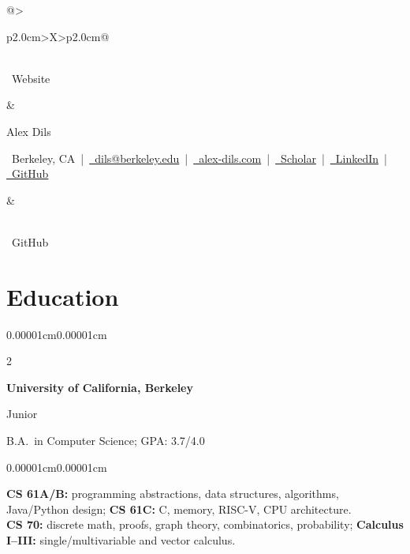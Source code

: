 \documentclass[10pt, letterpaper]{article}
\newenvironment{onecolentry}{
  \begin{adjustwidth}{0.00001cm}{0.00001cm}
}{
  \end{adjustwidth}
}
\newenvironment{twocolentry}[2][]{
  \onecolentry
  \def\secondColumn{#2}
  \setcolumnwidth{\fill,4.5cm}
  \begin{paracol}{2}
}{
  \switchcolumn \raggedleft \secondColumn
  \end{paracol}
  \endonecolentry
}
\newenvironment{header}{
  \setlength{\topsep}{0pt}\par\kern\topsep\linespread{1.25}
}{
  \par\kern\topsep
}
\begin{document}
  \begin{header}
    \begin{tabularx}{\textwidth}{@{}>{\raggedright\arraybackslash}p{2.0cm}>{\centering\arraybackslash}X>{\raggedleft\arraybackslash}p{2.0cm}@{}}
      \begin{minipage}[t]{\linewidth}
        \raggedright
        \href{https://www.alex-dils.com}{}\\[6pt]
        {\scriptsize \faGlobe\ Website}
      \end{minipage}
      &
      \begin{minipage}[t]{\linewidth}
        \centering
        \fontsize{23pt}{23pt}\selectfont Alex Dils

        \vspace{1pt}

        \scriptsize
        \faMapMarker\ Berkeley, CA \,|\, 
        \href{mailto:dils@berkeley.edu}{\faEnvelope\ dils@berkeley.edu} \,|\, 
        \href{https://www.alex-dils.com}{\faGlobe\ alex-dils.com} \,|\, 
        \href{https://scholar.google.com/citations?user=0Sz8VPoAAAAJ}{\faGraduationCap\ Scholar} \,|\, 
        \href{https://www.linkedin.com/in/alex-dils/}{\faLinkedin\ LinkedIn} \,|\, 
        \href{https://github.com/axel-slid}{\faGithub\ GitHub}
      \end{minipage}
      &
      \begin{minipage}[t]{\linewidth}
        \raggedleft
        \href{https://github.com/axel-slid}{}\\[6pt]
        {\scriptsize \faGithub\ GitHub}
      \end{minipage}
    \end{tabularx}
  \end{header}

  \vspace{-0.18cm}

  \section{Education}
  \begin{twocolentry}{Junior}
    \textbf{University of California, Berkeley}
  \end{twocolentry}
  B.A.\ in Computer Science; GPA: 3.7/4.0

  \begin{onecolentry}
    \small \textbf{CS 61A/B:} programming abstractions, data structures, algorithms, Java/Python design; \textbf{CS 61C:} C, memory, RISC-V, CPU architecture.\\[-1pt]
    \small \textbf{CS 70:} discrete math, proofs, graph theory, combinatorics, probability; \textbf{Calculus I--III:} single/multivariable and vector calculus.
  \end{onecolentry}
\end{document}
